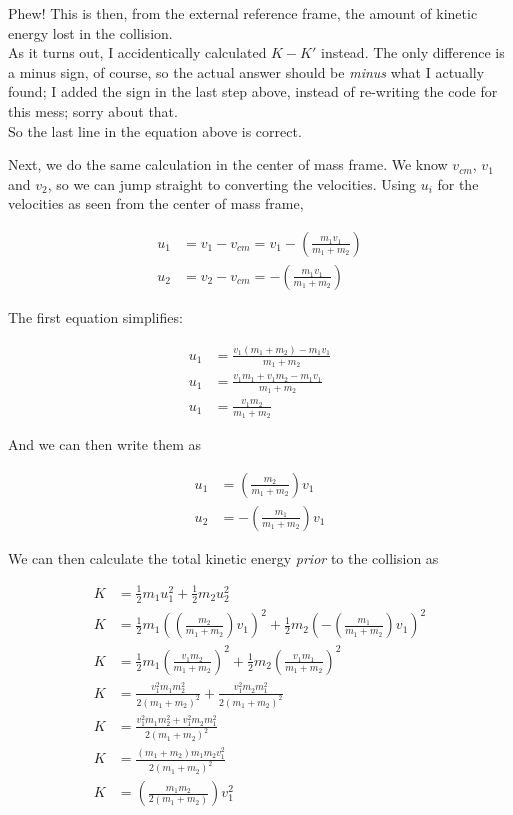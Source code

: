 \documentclass[12pt,a4paper]{report}
\begin{document}
Phew! This is then, from the external reference frame, the amount of kinetic energy lost in the collision.\\
As it turns out, I accidentically calculated $K - K'$ instead. The only difference is a minus sign, of course, so the actual answer should be \emph{minus} what I actually found; I added the sign in the last step above, instead of re-writing the code for this mess; sorry about that.\\
So the last line in the equation above is correct.

Next, we do the same calculation in the center of mass frame. We know $v_{cm}$, $v_1$ and $v_2$, so we can jump straight to converting the velocities. Using $u_i$ for the velocities as seen from the center of mass frame,

\begin{align}
u_1 &= v_1 - v_{cm} = v_1 - \left(\frac{m_1 v_1}{m_1 + m_2}\right)\\
u_2 &= v_2 - v_{cm} = - \left(\frac{m_1 v_1}{m_1 + m_2}\right)
\end{align}

The first equation simplifies:

\begin{align}
u_1 &= \frac{v_1(m_1 + m_2) - m_1 v_1}{m_1 + m_2}\\
u_1 &= \frac{v_1 m_1 + v_1 m_2 - m_1 v_1}{m_1 + m_2}\\
u_1 &= \frac{v_1 m_2}{m_1 + m_2}
\end{align}

And we can then write them as

\begin{align}
u_1 &= \left(\frac{m_2}{m_1 + m_2}\right) v_1\\
u_2 &= - \left(\frac{m_1}{m_1 + m_2}\right) v_1
\end{align}

We can then calculate the total kinetic energy \emph{prior} to the collision as

\begin{align}
K &= \frac{1}{2} m_1 u_1^2 + \frac{1}{2} m_2 u_2^2\\
K &= \frac{1}{2} m_1 \left(\left(\frac{m_2}{m_1 + m_2}\right) v_1\right)^2 + \frac{1}{2} m_2 \left(- \left(\frac{m_1}{m_1 + m_2}\right) v_1\right)^2\\
K &= \frac{1}{2} m_1 \left(\frac{v_1 m_2}{m_1 + m_2}\right)^2 + \frac{1}{2} m_2 \left(\frac{v_1 m_1}{m_1 + m_2}\right)^2\\
K &= \frac{v_1^2 m_1 m_2^2}{2(m_1 + m_2)^2} + \frac{v_1^2 m_2 m_1^2}{2(m_1 + m_2)^2}\\
K &= \frac{v_1^2 m_1 m_2^2 + v_1^2 m_2 m_1^2}{2(m_1 + m_2)^2}\\
K &= \frac{(m_1 + m_2) m_1 m_2 v_1^2}{2(m_1 + m_2)^2}\\
K &= \left(\frac{m_1 m_2}{2(m_1 + m_2)}\right) v_1^2
\end{align}
\end{document}
